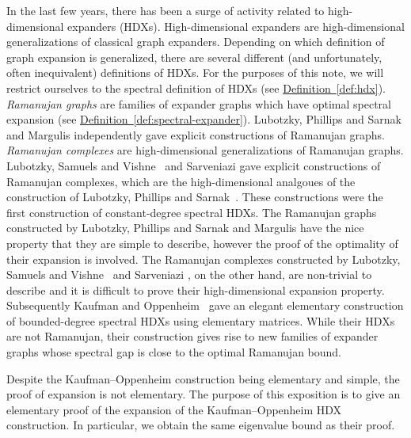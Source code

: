 \documentclass[11pt]{article}
\newcommand{\expref}[2]{\texorpdfstring{\hyperref[#2]{#1~\ref{#2}}}{#1~\ref{#2}}}
\begin{document}
In the last few years, there has been a surge of activity related to high-dimensional expanders (HDXs).
%
High-dimensional  %
expanders are
%
%
high-dimensional generalizations   %
of classical graph expanders.
Depending on which definition of graph expansion is generalized, 
there are several different (and unfortunately, 
%
often  %
%
%
%
inequivalent) definitions of HDXs.
For the %
purposes  %
of this note, we will restrict ourselves to the spectral definition 
of HDXs (see \expref{Definition}{def:hdx}).
%
\emph{Ramanujan graphs} are families of expander graphs which have optimal spectral expansion (see \expref{Definition}{def:spectral-expander}). Lubotzky,
Phillips and Sarnak \cite{LubotzkyPS1988} and Margulis \cite{margulis88} independently gave explicit 
constructions of %
Ramanujan graphs. \emph{Ramanujan complexes} are high-dimensional generalizations of Ramanujan graphs. 
Lubotzky, Samuels and Vishne~\cite{LubotzkySV2005-exphdx,LubotzkySV2005-hdx} and 
Sarveniazi \cite{Sarveniazi2007}
gave explicit constructions of %
 Ramanujan complexes, which are the high-dimensional analgoues
of the construction %
of Lubotzky, %
Phillips  %
and Sarnak~\cite{LubotzkyPS1988}.   %
%
%
%
%
%
%
%
%
%
These constructions were  %
the first construction of constant-degree %
spectral HDXs.
The Ramanujan %
graphs constructed by Lubotzky,  %
Phillips and Sarnak \cite{LubotzkyPS1988} and Margulis \cite{margulis88} have the 
nice property that they are simple to describe, 
however %
the proof of the optimality of their %
%
expansion is involved.
%
%
%
%
%
The Ramanujan %
complexes constructed by  %
Lubotzky, Samuels and Vishne~\cite{LubotzkySV2005-exphdx,LubotzkySV2005-hdx} and 
Sarveniazi \cite{Sarveniazi2007}, on the other hand, are non-trivial to describe
and it is difficult to prove their high-dimensional expansion property. %
%
Subsequently Kaufman and Oppenheim~\cite[See STOC version]{KaufmanO2018} gave an
%
%
elegant 
%
elementary construction of bounded-degree %
spectral HDXs using elementary matrices.
%
%
%
%
%
%
While their HDXs are not Ramanujan, their construction gives rise to
new families of expander graphs whose spectral gap is close to the
optimal Ramanujan bound.   %
%
%

Despite %
the Kaufman--Oppenheim   %
construction being elementary and simple, the proof of expansion
%
is  %
not elementary. 
%
%
%
%
%
%
%
%
%
%
%
%
%
%
%
%
%
%
The purpose of this exposition is to give an elementary proof 
%
of the expansion of the Kaufman--Oppenheim HDX construction. 
In particular, we obtain the same eigenvalue bound as their proof.  
%
%
%
%
%
\end{document}
